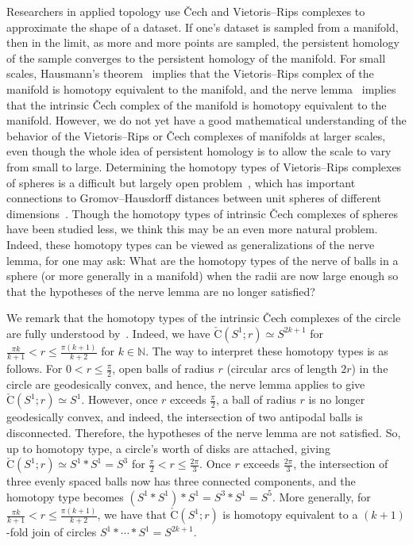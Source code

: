 \documentclass[11 pt,a4paper,twoside,reqno]{amsart}
\theoremstyle{definition}
\def\N{{\mathbb N}}
\newcommand{\cech}[2]{\mathrm{\check{C}}(#1;#2)}
\begin{document}
Researchers in applied topology use \v{C}ech and Vietoris--Rips complexes to approximate the shape of a dataset.
If one's dataset is sampled from a manifold, then in the limit, as more and more points are sampled, the persistent homology of the sample converges to the persistent homology of the manifold.
For small scales, Hausmann's theorem~\cite{Hausmann1995} implies that the Vietoris--Rips complex of the manifold is homotopy equivalent to the manifold, and the nerve lemma~\cite{Borsuk1948} implies that the intrinsic \v{C}ech complex of the manifold is homotopy equivalent to the manifold.
However, we do not yet have a good mathematical understanding of the behavior of the Vietoris--Rips or \v{C}ech complexes of manifolds at larger scales, even though the whole idea of persistent homology is to allow the scale to vary from small to large.
{Determining the homotopy types of Vietoris--Rips complexes of spheres is a difficult but largely open problem}~\cite{AA-VRS1,lim2022vietoris,ABV}, which has important connections to Gromov--Hausdorff distances between unit spheres of different dimensions~\cite{lim2022gromov,GH-BU-VR,harrison2023quantitative}.
Though the homotopy types of intrinsic \v{C}ech complexes of spheres have been studied less, we think this may be an even more natural problem.
Indeed, these homotopy types can be viewed as generalizations of the nerve lemma, for one may ask:
What are the homotopy types of the nerve of balls in a sphere (or more generally in a manifold) when the radii are now large enough so that the hypotheses of the nerve lemma are no longer satisfied?

We remark that the homotopy types of the intrinsic \v{C}ech complexes of the circle are fully understood by~\cite[Theorem 9.8]{AA-VRS1}.
Indeed, we have $\cech{S^1}{r} \simeq S^{2k+1}$ for $\frac{\pi k}{k+1} < r \le \frac{\pi (k+1)}{k+2}$ for $k\in \N$.
The way to interpret these homotopy types is as follows.
For $0<r\le \frac{\pi}{2}$, open balls of radius $r$ (circular arcs of length $2r$) in the circle are geodesically convex, and hence, the nerve lemma applies to give $\cech{S^1}{r}\simeq S^1$.
However, once $r$ exceeds $\frac{\pi}{2}$, a ball of radius $r$ is no longer geodesically convex, and indeed, the intersection of two antipodal balls is disconnected.
Therefore, the hypotheses of the nerve lemma are not satisfied.
So, up to homotopy type, a circle's worth of disks are attached, giving $\cech{S^1}{r}\simeq S^1*S^1=S^3$ for $\frac{\pi}{2} < r \le \frac{2\pi}{3}$.
Once $r$ exceeds $\frac{2\pi}{3}$, the intersection of three evenly spaced balls now has three connected components, and the homotopy type becomes $(S^1*S^1)*S^1=S^3*S^1=S^5$.
More generally, for $\frac{\pi k}{k+1} < r \le \frac{\pi (k+1)}{k+2}$, we have that $\cech{S^1}{r}$ is homotopy equivalent to a $(k+1)$-fold join of circles $S^1*\cdots*S^1=S^{2k+1}$.
\end{document}
